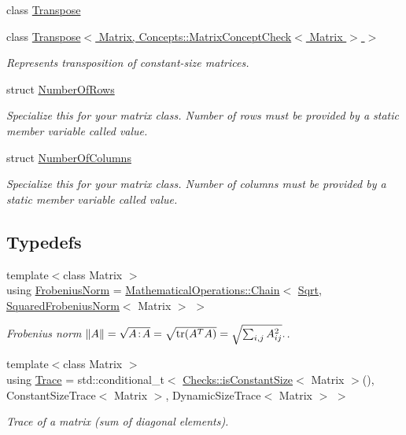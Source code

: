 \begin{DoxyCompactItemize}
class \hyperlink{classFunG_1_1LinearAlgebra_1_1Transpose}{Transpose}
\item 
class \hyperlink{classFunG_1_1LinearAlgebra_1_1Transpose_3_01Matrix_00_01Concepts_1_1MatrixConceptCheck_3_01Matrix_01_4_01_4}{Transpose$<$ Matrix, Concepts\-::\-Matrix\-Concept\-Check$<$ Matrix $>$ $>$}
\begin{DoxyCompactList}\small\item\em Represents transposition of constant-\/size matrices. \end{DoxyCompactList}\item 
struct \hyperlink{structFunG_1_1LinearAlgebra_1_1NumberOfRows}{Number\-Of\-Rows}
\begin{DoxyCompactList}\small\item\em Specialize this for your matrix class. Number of rows must be provided by a static member variable called value. \end{DoxyCompactList}\item 
struct \hyperlink{structFunG_1_1LinearAlgebra_1_1NumberOfColumns}{Number\-Of\-Columns}
\begin{DoxyCompactList}\small\item\em Specialize this for your matrix class. Number of columns must be provided by a static member variable called value. \end{DoxyCompactList}\end{DoxyCompactItemize}
\subsection*{Typedefs}
\begin{DoxyCompactItemize}
\item 
{\footnotesize template$<$class Matrix $>$ }\\using \hyperlink{group__LinearAlgebraGroup_gad209833e37a25e863fe72868d37795b8}{Frobenius\-Norm} = \hyperlink{structFunG_1_1MathematicalOperations_1_1Chain}{Mathematical\-Operations\-::\-Chain}$<$ \hyperlink{group__CMathGroup_ga70c69680e967f5ccb79c07e50d44739d}{Sqrt}, \hyperlink{structFunG_1_1LinearAlgebra_1_1SquaredFrobeniusNorm}{Squared\-Frobenius\-Norm}$<$ Matrix $>$ $>$
\begin{DoxyCompactList}\small\item\em Frobenius norm $ \|A\| = \sqrt{A\negthinspace : \negthinspace A }= \sqrt{\mathrm{tr}(A^TA)} = \sqrt{\sum_{i,j} A_{ij}^2}. $. \end{DoxyCompactList}\item 
{\footnotesize template$<$class Matrix $>$ }\\using \hyperlink{group__LinearAlgebraGroup_ga43e327309edc349c75ceecd29b7abde2}{Trace} = std\-::conditional\-\_\-t$<$ \hyperlink{group__ConceptGroup_gadcc3e179af2ed0384a3773ea086045b9}{Checks\-::is\-Constant\-Size}$<$ Matrix $>$(), Constant\-Size\-Trace$<$ Matrix $>$, Dynamic\-Size\-Trace$<$ Matrix $>$ $>$
\begin{DoxyCompactList}\small\item\em Trace of a matrix (sum of diagonal elements). \end{DoxyCompactList}\end{DoxyCompactItemize}
